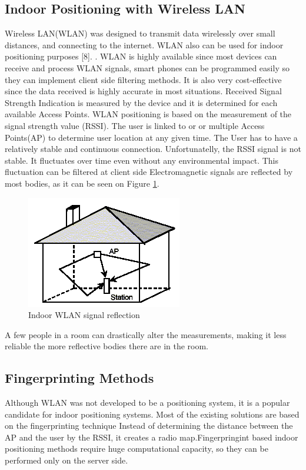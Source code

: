 \subsection{Indoor Positioning with Wireless LAN}
	Wireless LAN(WLAN) was designed to transmit data wirelessly over small distances, and connecting to the internet. WLAN also can be used for indoor positioning purposes [8]. \cite{evennou2006advanced}. WLAN is highly available since most devices can receive and process WLAN signals, smart phones can be programmed easily so they can implement client side filtering methods. It is also very cost-effective since the data received is highly accurate in most situations. Received Signal Strength Indication is measured by the device and it is determined for each available Access Points.
	 WLAN positioning is based on the measurement of the signal strength value (RSSI). The user  is linked to or or multiple Access Points(AP) to determine user location at any given time. The User has to have a relatively stable and continuous connection. Unfortunatelly, the RSSI signal is not stable. It fluctuates over time even without any environmental impact. This fluctuation can be filtered at client side Electromagnetic signals are reflected \cite{kjaergaard2012mobile} by most bodies, as it can be seen on Figure \ref{fig:kockahaz}.
	\begin{figure}[h]
		\centering
		\includegraphics[width=.3\linewidth]{figures/Reflect.png}
		\caption{Indoor WLAN signal reflection \cite{Reflections}}\label{fig:kockahaz}
	\end{figure}
	 A few people in a room can drastically alter the measurements, making it less reliable the more reflective bodies there are in the room. 

\subsection{Fingerprinting Methods}
	Although WLAN was not developed to be a positioning system, it is a popular candidate for indoor positioning systems.  Most of the existing solutions are based on the fingerprinting technique \cite{kaemarungsi2004properties}\cite{honkavirta2009comparative}  Instead of determining the distance between the AP and the user by the  RSSI, it creates a radio map.Fingerpringint based indoor positioning methods require huge computational capacity, so they can be performed only on the server side.
	
